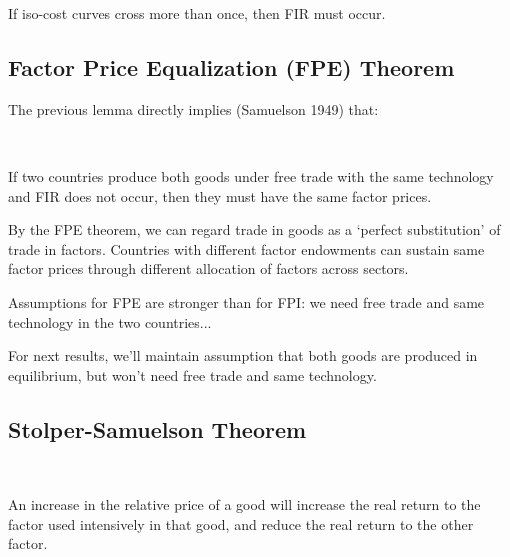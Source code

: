 
If iso-cost curves cross more than once, then FIR must occur.

\subsection{Factor Price Equalization (FPE) Theorem}

The previous lemma directly implies (Samuelson 1949) that:
\begin{theorem}\label{thm:FPE}
    \

    If two countries produce both goods under free trade with the same technology 
    and FIR does not occur, then they must have the same factor prices.
\end{theorem}

By the FPE theorem, we can regard trade in goods as a `perfect substitution' of trade in factors.
Countries with different factor endowments can sustain same factor
prices through different allocation of factors across sectors.

Assumptions for FPE are stronger than for FPI: we need free trade and
same technology in the two countries...

For next results, we'll maintain assumption that both goods are
produced in equilibrium, but won't need free trade and same technology.

\subsection{Stolper-Samuelson Theorem}

\begin{theorem}\label{thm:SS}
    \

    An increase in the relative price of a good will increase the real return
    to the factor used intensively in that good, and reduce the real return to the other factor.
\end{theorem}

